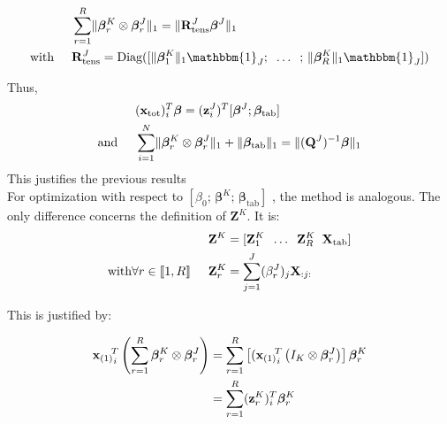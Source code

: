 \documentclass[10pt]{article}
\begin{document}
\begin{align}
                                & \sum\limits_{r = 1}^R \lVert \bm{\beta}_r^K \otimes \bm{\beta}_r^J \rVert_1 = \lVert \mathbf{R}_{\text{tens}}^J \bm{\beta}^J\rVert_1                             \\
    \text{with} \hspace{0.5 cm} & \mathbf{R}_{\text{tens}}^J = \text{Diag}([\lVert \bm{\beta}_1^K \rVert_1 \mathbbm{1}_J; \; \; \hdots \; \; ; \,  \lVert \bm{\beta}_R^K \rVert_1 \mathbbm{1}_J ])
\end{align}

\noindent Thus,
\begin{align}
                               & (\mathbf{x}_{\text{tot}})_i^T \bm{\beta}= (\mathbf{z}_i^J)^T [\bm{\beta}^J; \bm{\beta}_{\text{tab}}] \\
    \text{and} \hspace{0.5 cm} & \sum\limits_{i = 1}^N
    \lVert \bm{\beta}_r^K \otimes \bm{\beta}_r^J \rVert_1 + \lVert \bm{\beta}_{\text{tab}} \rVert_1= \lVert (\mathbf{Q}^J)^{-1} \bm{\beta} \rVert_1
\end{align}
This justifies the previous results\\[5 pt]
\noindent For optimization with respect to $\left[ \beta_0; \, \bm{\beta}^K; \, \bm{\beta}_{\text{tab}}  \right]$ , the method is analogous. The only difference concerns the definition of $\mathbf{Z}^K$. It is:
\begin{align}
                                                                         & \mathbf{Z}^K = [\mathbf{Z}_1^K \; \; \hdots \; \; \mathbf{Z}_R^K \; \; \mathbf{X}_{\text{tab}}] \\
    \text{with} \forall r \in \llbracket 1, R \rrbracket \hspace{0.5 cm} & \mathbf{Z}_r^K = \sum\limits_{j = 1}^J (\beta_r^J)_j \mathbf{X}_{:j:}
\end{align}

\noindent This is justified by:

\begin{align}
    {{\mathbf{x}_{(1)}}_i}^{\hspace{-5 pt} T}  \left( \sum\limits_{r = 1}^R \bm{\beta}_r^K \otimes \bm{\beta}_r^J \right) & = \sum\limits_{r = 1}^R \left[ ({{\mathbf{x}_{(1)}}_i}^{\hspace{-5 pt} T}  \left( I_K \otimes \bm{\beta}_r^J \right) \right] \bm{\beta}_r^K \\
                                                                                                                          & = \sum\limits_{r = 1}^R (\mathbf{z}_r^K)_i^T \bm{\beta}_r^K
\end{align}
\end{document}
